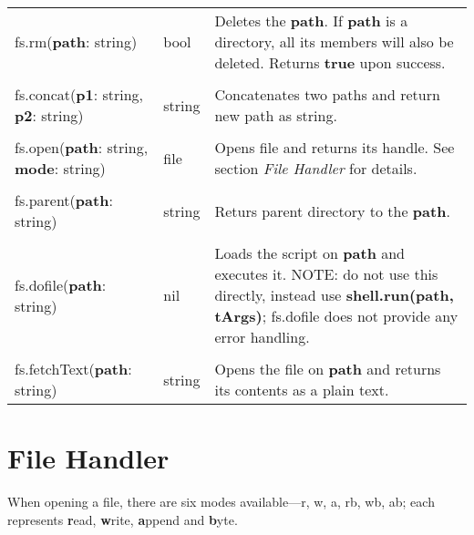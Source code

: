 \begin{tabularx}{\textwidth}{l l X}
	fs.rm(\textbf{path}: string) & bool & Deletes the \textbf{path}. If \textbf{path} is a directory, all its members will also be deleted. Returns \textbf{true} upon success.
	\\ \\
	fs.concat(\textbf{p1}: string, \textbf{p2}: string) & string & Concatenates two paths and return new path as string.
	\\ \\
	fs.open(\textbf{path}: string, \textbf{mode}: string) & file & Opens file and returns its handle. See section \emph{File Handler} for details.
	\\ \\
	fs.parent(\textbf{path}: string) & string & Returs parent directory to the \textbf{path}.
	\\ \\
	fs.dofile(\textbf{path}: string) & nil & Loads the script on \textbf{path} and executes it. NOTE: do not use this directly, instead use \textbf{shell.run(path, tArgs)}; fs.dofile does not provide any error handling.
	\\ \\
	fs.fetchText(\textbf{path}: string) & string & Opens the file on \textbf{path} and returns its contents as a plain text.
\end{tabularx}

\section{File Handler}

When opening a file, there are six modes available---r, w, a, rb, wb, ab; each represents \textbf{r}ead, \textbf{w}rite, \textbf{a}ppend and \textbf{b}yte.

